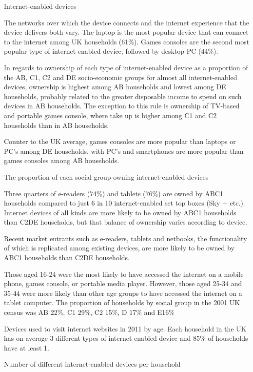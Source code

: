 \documentclass[letterpaper,10pt,openany,oneside,english]{sphinxmanual}
\begin{document}
Internet-enabled devices

The networks over which the device connects and the internet experience that the device delivers both vary. The laptop is the most popular device that can connect to the internet among UK households (61\%). Games consoles are the second most popular type of internet enabled device, followed by desktop PC (44\%).

In regards to ownership of each type of internet-enabled device as a proportion of the AB, C1, C2 and DE socio-economic groups \textendash{} for almost all internet-enabled devices, ownership is highest among AB households and lowest among DE households, probably related to the greater disposable income to spend on such devices in AB households. The exception to this rule is ownership of TV-based and portable games console, where take up is higher among C1 and C2 households than in AB households.

Counter to the UK average, games consoles are more popular than laptops or PC’s among DE households, with PC’s and smartphones are more popular than games consoles among AB households.

The proportion of each social group owning internet-enabled devices

Three quarters of e-readers (74\%) and tablets (76\%) are owned by ABC1 households compared to just 6 in 10 internet-enabled set top boxes (Sky + etc.). Internet devices of all kinds are more likely to be owned by ABC1 households than C2DE households, but that balance of ownership varies according to device.

Recent market entrants such as e-readers, tablets and netbooks, the functionality of which is replicated among existing devices, are more likely to be owned by ABC1 households than C2DE households.

Those aged 16-24 were the most likely to have accessed the internet on a mobile phone, games console, or portable media player. However, those aged 25-34 and 35-44 were more likely than other age groups to have accessed the internet on a tablet computer. The proportion of households by social group in the 2001 UK census was AB 22\%, C1 29\%, C2 15\%, D 17\% and E16\%

Devices used to visit internet websites in 2011 by age. Each household in the UK has on average 3 different types of internet enabled device and 85\% of households have at least 1.

Number of different internet-enabled devices per household
\end{document}
